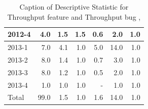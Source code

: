 \documentclass[UKenglish]{ifimaster}  %
\begin{document}
\begin{appendices}
\begin{table}[!htbp]
\begin{adjustwidth}{-2.5cm}{}
{{\begin{tabular}{ | l | r | r | r | r | r | r | }
2012-4 & 4.0 & 1.5 & 1.5 & 0.6 & 2.0 & 1.0\\ \hline
2013-1 & 7.0 & 4.1 & 1.0 & 5.0 & 14.0 & 1.0\\ \hline
2013-2 & 8.0 & 1.4 & 1.0 & 0.7 & 3.0 & 1.0\\ \hline
2013-3 & 8.0 & 1.2 & 1.0 & 0.5 & 2.0 & 1.0\\ \hline
2013-4 & 1.0 & 1.0 & 1.0 & - & 1.0 & 1.0\\ \hline
Total & 99.0 & 1.5 & 1.0 & 1.6 & 14.0 & 1.0\\ \hline
\end{tabular}
}
}
\end{adjustwidth}
\caption[Optional caption for list of figures]{Caption of Descriptive Statistic for Throughput feature and Throughput bug  , }
\label{DS:8:2}
\end{table}




\end{appendices}
\end{document}
